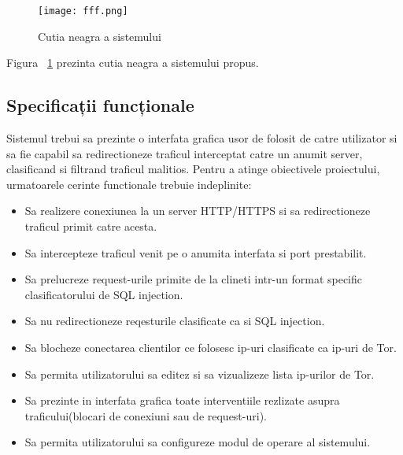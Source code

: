 \begin{figure}[h]
	\centering
	\texttt{[image: fff.png]}
	\caption{Cutia neagra a sistemului}
	\label{fig:black-box}
\end{figure}

Figura ~\ref{fig:black-box} prezinta cutia neagra a sistemului propus. \\

 \subsection{Specificații funcționale}

Sistemul trebui sa prezinte o interfata grafica usor de folosit de catre utilizator si sa fie capabil sa redirectioneze traficul interceptat catre un anumit server, clasificand si filtrand traficul malitios. Pentru a atinge obiectivele proiectului, urmatoarele cerinte functionale trebuie indeplinite:
\begin{itemize}
  \item Sa realizere conexiunea la un server HTTP/HTTPS si sa redirectioneze traficul primit catre acesta.
  \item Sa intercepteze traficul venit pe o anumita interfata si port prestabilit.
  \item Sa prelucreze request-urile primite de la clineti intr-un format specific clasificatorului de SQL injection.
  \item Sa nu redirectioneze reqesturile clasificate ca si SQL injection.
  \item Sa blocheze conectarea clientilor ce folosesc ip-uri clasificate ca ip-uri de Tor.
  \item Sa permita utilizatorului sa editez si sa vizualizeze lista ip-urilor de Tor.
  \item Sa prezinte in interfata grafica toate interventiile rezlizate asupra traficului(blocari de conexiuni sau de request-uri).
  \item Sa permita utilizatorului sa configureze modul de operare al sistemului.
\end{itemize}


